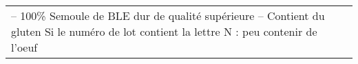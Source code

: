 \begin{longtable}{p{9cm}p{9cm}c}
                                                                                                                                                                                                                                                                                                                                                                                                                                                                                                                                                                                                                                                                                                                                                                                                                                                                                                                                                                                                                                                                                                                                                                                                                                                                                                                                                                                                                                                                                                                                                                                                                                                                                                                                                                                                                                                                                                                                                                                                                                         –  100\% Semoule de BLE dur de qualité supérieure  \newline –  Contient du gluten  \newline Si le numéro de lot contient la lettre N : peu contenir de l’oeuf &                                                                                                                                                                                                                                                                                                                                                                                                                                                                                                                                                                                                                                                                                                                                                                                                                                                                                                                                                                                                                                                                                               
\end{longtable}
